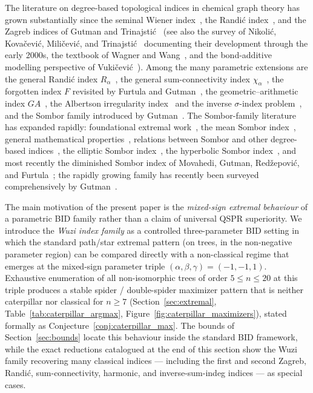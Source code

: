 \documentclass[a5paper, 10pt]{article}
\theoremstyle{plain}
\theoremstyle{remark}
\theoremstyle{definition}
\begin{document}
The literature on degree-based topological indices in chemical
graph theory has grown substantially since the seminal Wiener
index~\cite{Wiener1947}, the Randi\'c index~\cite{Randic1975},
and the Zagreb indices of Gutman and
Trinajsti\'c~\cite{Gutman1972} (see also the survey of
Nikoli\'c, Kova\v{c}evi\'c, Mili\v{c}evi\'c, and
Trinajsti\'c~\cite{NikolicKovacevicMilicevicTrinajstic2003}
documenting their development through the early 2000s, the
textbook of Wagner and
Wang~\cite{WagnerWang2018ChemGraphTheory}, and the bond-additive
modelling perspective of Vuki\v{c}evi\'c~\cite{Vukicevic2010BondAdditive2}).
Among the many parametric extensions are the general Randi\'c
index $R_{\alpha}$~\cite{BollobasErdos1998}, the general
sum-connectivity index
$\chi_{\alpha}$~\cite{ZhouTrinajstic2009sumconn}, the forgotten
index $F$ revisited by Furtula and
Gutman~\cite{FurtulaGutman2015F}, the geometric--arithmetic index
$GA$~\cite{VukicevicFurtula2009GA}, the Albertson irregularity
index~\cite{Albertson1997} and the inverse $\sigma$-index
problem~\cite{GutmanToganYurttasCevikCangul2018Sigma}, and the
Sombor family introduced by Gutman~\cite{Gutman2021Sombor,
Gutman2021SomborBasic}. The Sombor-family literature has expanded
rapidly: foundational extremal
work~\cite{DasCevikCangulShang2021Sombor, DasGutman2022SomborTrees},
the mean Sombor
index~\cite{MendezBermudezAguilarSanchez2022MeanSombor}, general
mathematical properties~\cite{MilovanovicMilovanovicMatejic2021Sombor},
relations between Sombor and other degree-based
indices~\cite{WangMaoLiFurtula2022SomborRelations}, the
elliptic Sombor index~\cite{GutmanFurtulaOz2024Elliptic}, the
hyperbolic Sombor index~\cite{BarmanDas2026HSO}, and most recently
the diminished Sombor index of Movahedi, Gutman, Red\v{z}epovi\'c,
and Furtula~\cite{MovahediGutmanRedzepovicFurtula2026, Movahedi2025DSO};
the rapidly growing family has recently been surveyed
comprehensively by Gutman~\cite{Gutman2026SomborSurvey}.

The main motivation of the present paper is the
\emph{mixed-sign extremal behaviour} of a parametric BID family
rather than a claim of universal QSPR superiority. We introduce
the \emph{Wuzi index family} as a controlled three-parameter BID
setting in which the standard path/star extremal pattern (on
trees, in the non-negative parameter region) can be compared
directly with a non-classical regime that emerges at the
mixed-sign parameter triple
$(\alpha, \beta, \gamma) = (-1, -1, 1)$. Exhaustive enumeration
of all non-isomorphic trees of order $5 \le n \le 20$ at this
triple produces a stable spider / double-spider maximizer
pattern that is neither caterpillar nor classical for $n \ge 7$
(Section~\ref{sec:extremal}, Table~\ref{tab:caterpillar_argmax},
Figure~\ref{fig:caterpillar_maximizers}), stated formally as
Conjecture~\ref{conj:caterpillar_max}. The bounds of
Section~\ref{sec:bounds} locate this behaviour inside the
standard BID framework, while the exact reductions catalogued at
the end of this section show the Wuzi family recovering many
classical indices --- including the first and second Zagreb,
Randi\'c, sum-connectivity, harmonic, and inverse-sum-indeg
indices --- as special cases.
\end{document}
